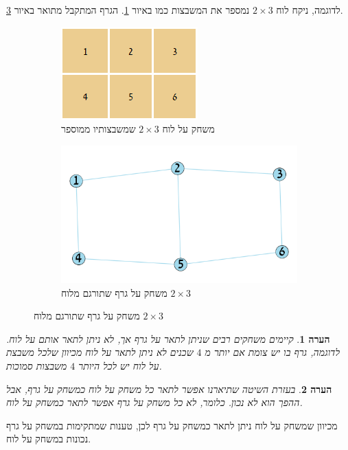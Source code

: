 \documentclass[12pt,leqno]{article}
\theoremstyle{theoremdd}
\newtheorem{comm}{הערה}[section]
\begin{document}
לדוגמה, ניקח לוח
$2 \times 3$
נמספר את המשבצות כמו באיור
\ref{2x3_board}.
הגרף המתקבל מתואר באיור
\ref{2x3_graph}.

\begin{figure}[ht]
    \caption{
        דוגמה
        למשחק על לוח שתורגם למשחק על גרף
        }
    \begin{subfigure}{.5\textwidth}
        \caption{
            משחק על לוח
            $2 \times 3$
            שמשבצותיו
            ממוספר
        }
        \label{2x3_board}
        \centering
        \includegraphics[scale=.95]{images/2x3_board.PNG}
    \end{subfigure}%
    \begin{subfigure}{.5\textwidth}
        \caption{
            משחק על גרף
            שתורגם מלוח
            $2 \times 3$
        }
        \centering
        \label{2x3_graph}
        \includegraphics[scale=0.8]{images/2x3_graph.png}
    \end{subfigure}%
\end{figure}

\begin{comm}
קיימים משחקים רבים שניתן לתאר על גרף אך, לא ניתן לתאר אותם על לוח.
לדוגמה, גרף בו יש צומת אם יותר מ
$4$
שכנים לא ניתן לתאר על לוח מכיוון
שלכל
משבצת על לוח
יש לכל היותר
$4$
משבצות סמוכות.
\end{comm}
\begin{comm}
    בעזרת השיטה שתיארנו אפשר לתאר כל משחק על לוח כמשחק על גרף, אבל ההפך הוא לא נכון.
כלומר, לא כל משחק על גרף אפשר לתאר כמשחק על לוח.
\end{comm}
מכיוון שמשחק על לוח ניתן לתאר כמשחק על גרף לכן, טענות שמתקימות
במשחק על גרף נכונות במשחק על לוח.
\end{document}
